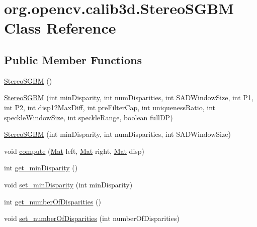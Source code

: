 \hypertarget{classorg_1_1opencv_1_1calib3d_1_1_stereo_s_g_b_m}{}\section{org.\+opencv.\+calib3d.\+Stereo\+S\+G\+BM Class Reference}
\label{classorg_1_1opencv_1_1calib3d_1_1_stereo_s_g_b_m}
\subsection*{Public Member Functions}
\begin{DoxyCompactItemize}
\item 
\mbox{\hyperlink{classorg_1_1opencv_1_1calib3d_1_1_stereo_s_g_b_m_a08dc75ba449a7f4915a258606bbd5e54}{Stereo\+S\+G\+BM}} ()
\item 
\mbox{\hyperlink{classorg_1_1opencv_1_1calib3d_1_1_stereo_s_g_b_m_a64c7dbc911b7e91e856c54d0a909ba70}{Stereo\+S\+G\+BM}} (int min\+Disparity, int num\+Disparities, int S\+A\+D\+Window\+Size, int P1, int P2, int disp12\+Max\+Diff, int pre\+Filter\+Cap, int uniqueness\+Ratio, int speckle\+Window\+Size, int speckle\+Range, boolean full\+DP)
\item 
\mbox{\hyperlink{classorg_1_1opencv_1_1calib3d_1_1_stereo_s_g_b_m_ae51af75ecc37375579176196217bdefe}{Stereo\+S\+G\+BM}} (int min\+Disparity, int num\+Disparities, int S\+A\+D\+Window\+Size)
\item 
void \mbox{\hyperlink{classorg_1_1opencv_1_1calib3d_1_1_stereo_s_g_b_m_ae1c6f9f628327a3bb39262709f5fee86}{compute}} (\mbox{\hyperlink{classorg_1_1opencv_1_1core_1_1_mat}{Mat}} left, \mbox{\hyperlink{classorg_1_1opencv_1_1core_1_1_mat}{Mat}} right, \mbox{\hyperlink{classorg_1_1opencv_1_1core_1_1_mat}{Mat}} disp)
\item 
int \mbox{\hyperlink{classorg_1_1opencv_1_1calib3d_1_1_stereo_s_g_b_m_ad59384225660deb40a162aaf07e2bd20}{get\+\_\+min\+Disparity}} ()
\item 
void \mbox{\hyperlink{classorg_1_1opencv_1_1calib3d_1_1_stereo_s_g_b_m_aabb95d3b1975a55125a5dfcb71599fae}{set\+\_\+min\+Disparity}} (int min\+Disparity)
\item 
int \mbox{\hyperlink{classorg_1_1opencv_1_1calib3d_1_1_stereo_s_g_b_m_ad89563cf77ff1d696c6237234949e3db}{get\+\_\+number\+Of\+Disparities}} ()
\item 
void \mbox{\hyperlink{classorg_1_1opencv_1_1calib3d_1_1_stereo_s_g_b_m_a31729ea9ac58e808c13215e8e202a8f6}{set\+\_\+number\+Of\+Disparities}} (int number\+Of\+Disparities)

\end{DoxyCompactItemize}
